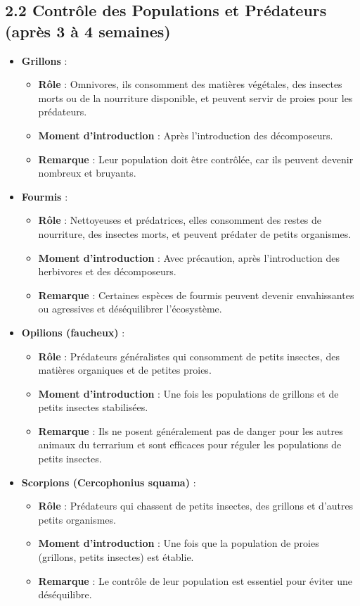 \subsection*{2.2 Contrôle des Populations et Prédateurs (après 3 à 4 semaines)}
\begin{itemize}
    \item \textbf{Grillons} :
    \begin{itemize}
        \item \textbf{Rôle} : Omnivores, ils consomment des matières végétales, des insectes morts ou de la nourriture disponible, et peuvent servir de proies pour les prédateurs.
        \item \textbf{Moment d'introduction} : Après l'introduction des décomposeurs.
        \item \textbf{Remarque} : Leur population doit être contrôlée, car ils peuvent devenir nombreux et bruyants.
    \end{itemize}
    \item \textbf{Fourmis} :
    \begin{itemize}
        \item \textbf{Rôle} : Nettoyeuses et prédatrices, elles consomment des restes de nourriture, des insectes morts, et peuvent prédater de petits organismes.
        \item \textbf{Moment d'introduction} : Avec précaution, après l'introduction des herbivores et des décomposeurs.
        \item \textbf{Remarque} : Certaines espèces de fourmis peuvent devenir envahissantes ou agressives et déséquilibrer l'écosystème.
    \end{itemize}
    \item \textbf{Opilions (faucheux)} :
    \begin{itemize}
        \item \textbf{Rôle} : Prédateurs généralistes qui consomment de petits insectes, des matières organiques et de petites proies.
        \item \textbf{Moment d'introduction} : Une fois les populations de grillons et de petits insectes stabilisées.
        \item \textbf{Remarque} : Ils ne posent généralement pas de danger pour les autres animaux du terrarium et sont efficaces pour réguler les populations de petits insectes.
    \end{itemize}
    \item \textbf{Scorpions (Cercophonius squama)} :
    \begin{itemize}
        \item \textbf{Rôle} : Prédateurs qui chassent de petits insectes, des grillons et d'autres petits organismes.
        \item \textbf{Moment d'introduction} : Une fois que la population de proies (grillons, petits insectes) est établie.
        \item \textbf{Remarque} : Le contrôle de leur population est essentiel pour éviter une déséquilibre.
    \end{itemize}
\end{itemize}

